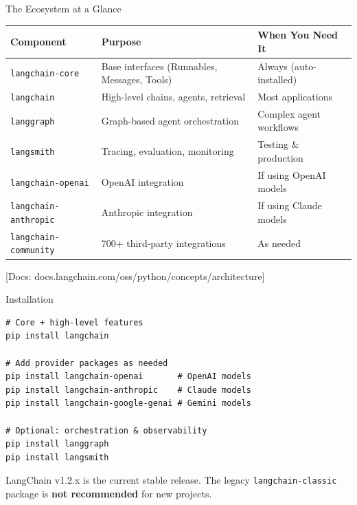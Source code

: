 \documentclass[aspectratio=169,11pt]{beamer}
\newcommand{\docref}[1]{{\scriptsize\color{docgray}[Docs: #1]}}
\begin{document}
\begin{frame}{The Ecosystem at a Glance}

\begin{center}
\renewcommand{\arraystretch}{1.3}
\footnotesize
\begin{tabular}{lp{4.5cm}p{3.5cm}}
\toprule
\textbf{Component} & \textbf{Purpose} & \textbf{When You Need It} \\
\midrule
\texttt{langchain-core} & Base interfaces (Runnables, Messages, Tools) & Always (auto-installed) \\
\texttt{langchain} & High-level chains, agents, retrieval & Most applications \\
\texttt{langgraph} & Graph-based agent orchestration & Complex agent workflows \\
\texttt{langsmith} & Tracing, evaluation, monitoring & Testing \& production \\
\texttt{langchain-openai} & OpenAI integration & If using OpenAI models \\
\texttt{langchain-anthropic} & Anthropic integration & If using Claude models \\
\texttt{langchain-community} & 700+ third-party integrations & As needed \\
\bottomrule
\end{tabular}
\end{center}

\docref{docs.langchain.com/oss/python/concepts/architecture}
\end{frame}

\begin{frame}[fragile]{Installation}

\begin{codebox}
\begin{lstlisting}
# Core + high-level features
pip install langchain

# Add provider packages as needed
pip install langchain-openai       # OpenAI models
pip install langchain-anthropic    # Claude models
pip install langchain-google-genai # Gemini models

# Optional: orchestration & observability
pip install langgraph
pip install langsmith
\end{lstlisting}
\end{codebox}

\vspace{0.15cm}

\begin{warningbox}
LangChain v1.2.x is the current stable release. The legacy \texttt{langchain-classic} package is \textbf{not recommended} for new projects.
\end{warningbox}
\end{frame}
\end{document}
